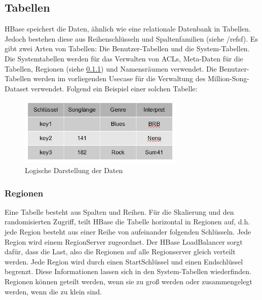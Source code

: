 \subsection{Tabellen}
HBase speichert die Daten, ähnlich wie eine relationale Datenbank in Tabellen. Jedoch bestehen diese aus Reihenschlüsseln und Spaltenfamilien (siehe /ref{sf}). Es gibt zwei Arten von Tabellen: Die Benutzer-Tabellen und die System-Tabellen.
Die Systemtabellen werden für das Verwalten von \acp{ACL}, Meta-Daten für die Tabellen, Regionen (siehe \ref{region}) und Namensräumen verwendet. Die Benutzer-Tabellen werden im vorliegenden Usecase für die Verwaltung des Million-Song-Dataset verwendet. Folgend ein Beispiel einer solchen Tabelle:

\begin{figure}[htbp] 
  \centering
     \includegraphics[width=0.7\textwidth]{images/logisch.jpg}
  \caption{Logische Darstellung der Daten}
  \label{fig:Logische Darstellung der Daten}
\end{figure}



\subsubsection{Regionen}\label{region}
Eine Tabelle besteht aus Spalten und Reihen. Für die Skalierung  und den randomisierten Zugriff, teilt HBase die Tabelle horizontal in Regionen auf, d.h. jede Region besteht aus einer Reihe von aufeinander folgenden Schlüsseln. Jede Region wird einem RegionServer zugeordnet. Der HBase LoadBalancer sorgt dafür, dass die Last, also die Regionen auf alle Regionserver gleich verteilt werden. Jede Region wird durch einen StartSchlüssel und einen Endschlüssel begrenzt. Diese Informationen lassen sich in den System-Tabellen wiederfinden. Regionen können geteilt werden, wenn sie zu groß werden oder zusammengelegt werden, wenn die zu klein sind.

